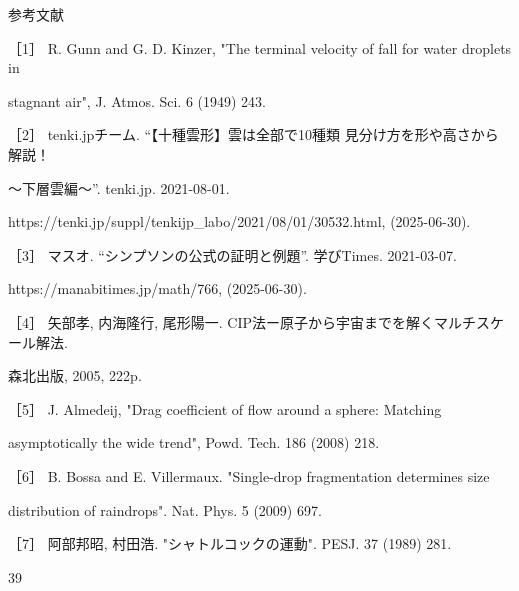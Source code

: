 参考⽂献\par
［1］ R. Gunn and G. D. Kinzer, "The terminal velocity of fall for water droplets in\par
stagnant air", J. Atmos. Sci. 6 (1949) 243.\par
［2］ tenki.jpチーム. “【⼗種雲形】雲は全部で10種類 ⾒分け⽅を形や⾼さから解説！\par
～下層雲編～”. tenki.jp. 2021-08-01.\par
https://tenki.jp/suppl/tenkijp\_labo/2021/08/01/30532.html, (2025-06-30).\par
［3］ マスオ. “シンプソンの公式の証明と例題”. 学びTimes. 2021-03-07.\par
https://manabitimes.jp/math/766, (2025-06-30).\par
［4］ ⽮部孝, 内海隆⾏, 尾形陽⼀. CIP法ー原⼦から宇宙までを解くマルチスケール解法.\par
森北出版, 2005, 222p.\par
［5］ J. Almedeij, "Drag coeﬃcient of ﬂow around a sphere: Matching\par
asymptotically the wide trend", Powd. Tech. 186 (2008) 218.\par
［6］ B. Bossa and E. Villermaux. "Single-drop fragmentation determines size\par
distribution of raindrops". Nat. Phys. 5 (2009) 697.\par
［7］ 阿部邦昭, 村⽥浩. "シャトルコックの運動". PESJ. 37 (1989) 281.\par
39\par

